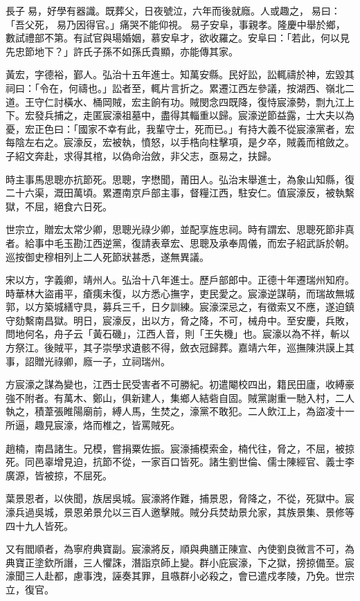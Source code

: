\begin{pinyinscope}
長子易，好學有器識。既葬父，日夜號泣，六年而後就廕。人或趣之，易曰：「吾父死，易乃因得官。」痛哭不能仰視。易子安阜，事親孝。隆慶中舉於鄉，數試禮部不第。有試官與瑒婚姻，慕安阜才，欲收羅之。安阜曰：「若此，何以見先忠節地下？」許氏子孫不如孫氏貴顯，亦能傳其家。

黃宏，字德裕，鄞人。弘治十五年進士。知萬安縣。民好訟，訟輒禱於神，宏毀其祠曰：「令在，何禱也。」訟者至，輒片言折之。累遷江西左參議，按湖西、嶺北二道。王守仁討橫水、桶岡賊，宏主餉有功。賊閔念四既降，復恃宸濠勢，剽九江上下。宏發兵捕之，走匿宸濠祖墓中，盡得其輜重以歸。宸濠逆節益露，士大夫以為憂，宏正色曰：「國家不幸有此，我輩守士，死而已。」有持大義不從宸濠黨者，宏每陰左右之。宸濠反，宏被執，憤怒，以手梏向柱擊項，是夕卒，賊義而棺斂之。子紹文奔赴，求得其棺，以偽命治斂，非父志，亟易之，扶歸。

時主事馬思聰亦抗節死。思聰，字懋聞，莆田人。弘治末舉進士，為象山知縣，復二十六渠，溉田萬頃。累遷南京戶部主事，督糧江西，駐安仁。值宸濠反，被執繫獄，不屈，絕食六日死。

世宗立，贈宏太常少卿，思聰光祿少卿，並配享旌忠祠。時有謂宏、思聰死節非真者。給事中毛玉勘江西逆黨，復請表章宏、思聰及承奉周儀，而宏子紹武訴於朝。巡按御史穆相列上二人死節狀甚悉，遂無異議。

宋以方，字義卿，靖州人。弘治十八年進士。歷戶部郎中。正德十年遷瑞州知府。時華林大盜甫平，瘡痍未復，以方悉心撫字，吏民愛之。宸濠逆謀萌，而瑞故無城郭，以方築城繕守具，募兵三千，日夕訓練。宸濠深忌之，有徵索又不應，遂迫鎮守劾繫南昌獄。明日，宸濠反，出以方，脅之降，不可，械舟中。至安慶，兵敗，問地何名，舟子云「黃石磯」，江西人音，則「王失機」也。宸濠以為不祥，斬以方祭江。後賊平，其子崇學求遺骸不得，斂衣冠歸葬。嘉靖六年，巡撫陳洪謨上其事，詔贈光祿卿，廕一子，立祠瑞州。

方宸濠之謀為變也，江西士民受害者不可勝紀。初遣閹校四出，籍民田廬，收縛豪強不附者。有萬木、鄭山，俱新建人，集鄉人結砦自固。賊黨謝重一馳入村，二人執之，積葦張睢陽廟前，縛人馬，生焚之，濠黨不敢犯。二人飲江上，為盜凌十一所逼，趣見宸濠，烙而椎之，皆罵賊死。

趙楠，南昌諸生。兄模，嘗捐粟佐振。宸濠捕模索金，楠代往，脅之，不屈，被掠死。同邑辜增見迫，抗節不從，一家百口皆死。諸生劉世倫、儒士陳經官、義士李廣源，皆被掠，不屈死。

葉景恩者，以俠聞，族居吳城。宸濠將作難，捕景恩，脅降之，不從，死獄中。宸濠兵過吳城，景恩弟景允以三百人邀擊賊。賊分兵焚劫景允家，其族景集、景修等四十九人皆死。

又有閻順者，為寧府典寶副。宸濠將反，順與典膳正陳宣、內使劉良微言不可，為典寶正塗欽所譖，三人懼誅，潛詣京師上變。群小庇宸濠，下之獄，搒掠備至。宸濠聞三人赴都，慮事洩，誣奏其罪，且嗾群小必殺之，會已遣戍孝陵，乃免。世宗立，復官。


\end{pinyinscope}
